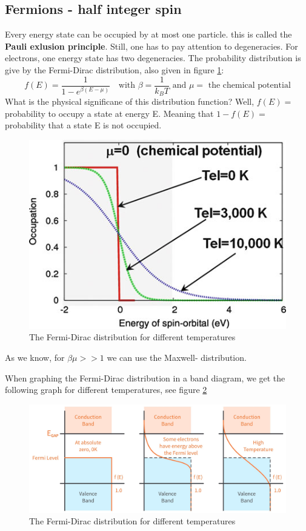 \subsection{Fermions - half integer spin}
Every energy state can be occupied by at most one particle. this is called the \textbf{Pauli exlusion principle}. Still, one has to pay attention to degeneracies. For electrons, one energy state has two degeneracies. The probability distribution is give by the Fermi-Dirac distribution, also given in figure \ref{fig:fermidiracdistr}:
\begin{equation}
	f(E) = \frac{1}{1 - e^{\beta (E - \mu)}} \quad \text{with } \beta = \frac{1}{k_BT} \text{ and } \mu = \text{ the chemical potential}
\end{equation}
What is the physical significane of this distribution function? Well, $f(E) = $ probability to occupy a state at energy E. Meaning that $1 - f(E) = $ probability that a state E is not occupied.
\begin{figure}[h]
	\centering
	\includegraphics[scale=0.5]{./fermi.png}
	\caption{The Fermi-Dirac distribution for different temperatures}
	\label{fig:fermidiracdistr}
\end{figure}
As we know, for $\beta\mu >> 1$ we can use the Maxwell- distribution. \\ \par
When graphing the Fermi-Dirac distribution in a band diagram, we get the following graph for different temperatures, see figure \ref{fig:fermidiracinenergyband}
\begin{figure}[h]
	\centering
	\includegraphics[scale=0.2]{./fermidirac_in_banddiagram.jpg}
	\caption{The Fermi-Dirac distribution for different temperatures}
	\label{fig:fermidiracinenergyband}
\end{figure}
